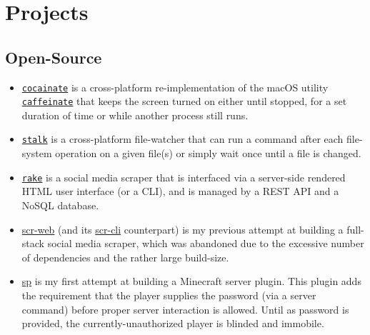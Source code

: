 \documentclass[a4paper]{article}
\begin{document}
	\section{Projects}
	\subsection{Open-Source}

	\begin{itemize}
		\item \href{https://github.com/AppleGamer22/cocainate}{\texttt{cocainate}} is a cross-platform re-implementation of the macOS utility \href{https://github.com/apple-oss-distributions/PowerManagement/tree/main/caffeinate}{\texttt{caffeinate}} that keeps the screen turned on either until stopped, for a set duration of time or while another process still runs.
		\item \href{https://github.com/AppleGamer22/stalk}{\texttt{stalk}} is a cross-platform file-watcher that can run a command after each file-system operation on a given file(s) or simply wait once until a file is changed.
		\item \href{https://github.com/AppleGamer22/rake}{\texttt{rake}} is a social media scraper that is interfaced via a server-side rendered HTML user interface (or a CLI), and is managed by a REST API and a NoSQL database.
		\item \href{https://github.com/AppleGamer22/scr-web}{scr-web} (and its \href{https://github.com/AppleGamer22/scr-cli}{scr-cli} counterpart) is my previous attempt at building a full-stack social media scraper, which was abandoned due to the excessive number of dependencies and the rather large build-size.
		\item \href{https://github.com/AppleGamer22/sp}{sp} is my first attempt at building a Minecraft server plugin. This plugin adds the requirement that the player supplies the password (via a server command) before proper server interaction is allowed. Until as password is provided, the currently-unauthorized player is blinded and immobile.
	\end{itemize}
\end{document}
